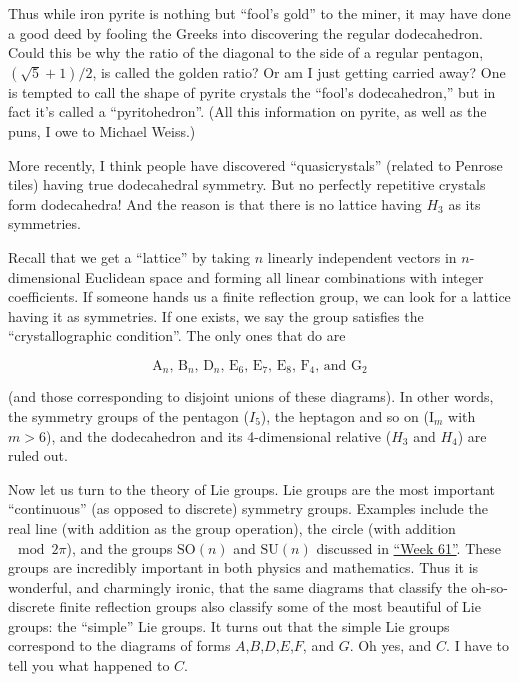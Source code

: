 \documentclass{article}
\begin{document}
Thus while iron pyrite is nothing but ``fool's gold'' to the miner, it
may have done a good deed by fooling the Greeks into discovering the
regular dodecahedron. Could this be why the ratio of the diagonal to the
side of a regular pentagon, \((\sqrt{5} + 1)/2\), is called the golden
ratio? Or am I just getting carried away? One is tempted to call the
shape of pyrite crystals the ``fool's dodecahedron,'' but in fact it's
called a ``pyritohedron''. (All this information on pyrite, as well as
the puns, I owe to Michael Weiss.)

More recently, I think people have discovered ``quasicrystals'' (related
to Penrose tiles) having true dodecahedral symmetry. But no perfectly
repetitive crystals form dodecahedra! And the reason is that there is no
lattice having \(H_3\) as its symmetries.

Recall that we get a ``lattice'' by taking \(n\) linearly independent
vectors in \(n\)-dimensional Euclidean space and forming all linear
combinations with integer coefficients. If someone hands us a finite
reflection group, we can look for a lattice having it as symmetries. If
one exists, we say the group satisfies the ``crystallographic
condition''. The only ones that do are

\[\mbox{$\mathrm{A}_n$, $\mathrm{B}_n$, $\mathrm{D}_n$, $\mathrm{E}_6$, $\mathrm{E}_7$, $\mathrm{E}_8$, $\mathrm{F}_4$, and $\mathrm{G}_2$}\]

(and those corresponding to disjoint unions of these diagrams). In other
words, the symmetry groups of the pentagon (\(I_5\)), the heptagon and
so on (\(\mathrm{I}_m\) with \(m > 6\)), and the dodecahedron and its
4-dimensional relative (\(H_3\) and \(H_4\)) are ruled out.

Now let us turn to the theory of Lie groups. Lie groups are the most
important ``continuous'' (as opposed to discrete) symmetry groups.
Examples include the real line (with addition as the group operation),
the circle (with addition \(\mod 2\pi\)), and the groups
\(\mathrm{SO}(n)\) and \(\mathrm{SU}(n)\) discussed in
\protect\hyperlink{week61}{``Week 61''}. These groups are incredibly
important in both physics and mathematics. Thus it is wonderful, and
charmingly ironic, that the same diagrams that classify the
oh-so-discrete finite reflection groups also classify some of the most
beautiful of Lie groups: the ``simple'' Lie groups. It turns out that
the simple Lie groups correspond to the diagrams of forms
\(A\),\(B\),\(D\),\(E\),\(F\), and \(G\). Oh yes, and \(C\). I have to
tell you what happened to \(C\).
\end{document}
